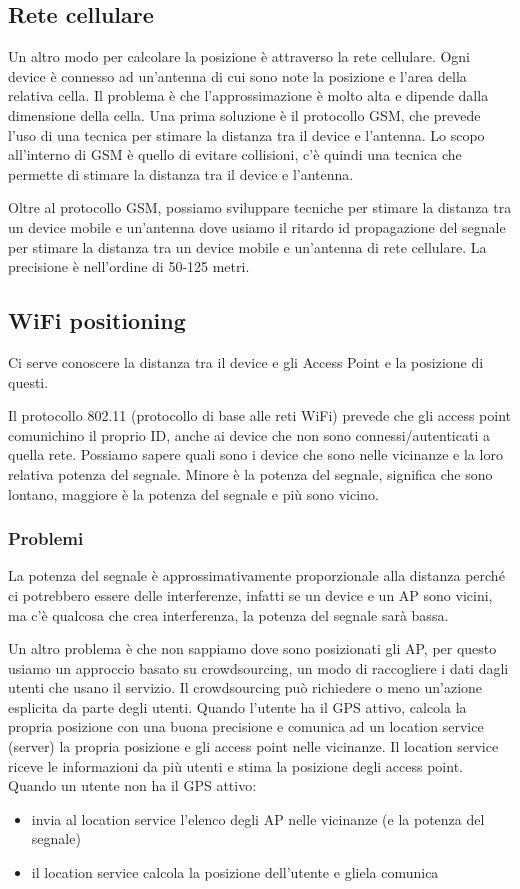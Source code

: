 \subsection{Rete cellulare}
Un altro modo per calcolare la posizione è attraverso la rete cellulare.
Ogni device è connesso ad un'antenna di cui sono note la posizione e l'area della relativa cella. 
Il problema è che l'approssimazione è molto alta e dipende dalla dimensione della cella. 
Una prima soluzione è il protocollo GSM, che prevede l'uso di una tecnica per stimare la distanza tra il device e l'antenna.
Lo scopo all'interno di GSM è quello di evitare collisioni, c'è quindi una tecnica che permette di stimare la distanza tra il device e l'antenna. 

Oltre al protocollo GSM, possiamo sviluppare tecniche per stimare la distanza tra un device mobile e un'antenna dove usiamo il ritardo id propagazione del segnale per stimare la distanza tra un device mobile e un'antenna di rete cellulare. La precisione è nell'ordine di 50-125 metri. 


\subsection{WiFi positioning}
Ci serve conoscere la distanza tra il device e gli Access Point e la posizione di questi. 

Il protocollo 802.11 (protocollo di base alle reti WiFi) prevede che gli access point comunichino il proprio ID, anche ai device che non sono connessi/autenticati a quella rete.
Possiamo sapere quali sono i device che sono nelle vicinanze e la loro relativa potenza del segnale. Minore è la potenza del segnale, significa che sono lontano, maggiore è la potenza del segnale e più sono vicino.

\subsubsection{Problemi}
La potenza del segnale è approssimativamente proporzionale alla distanza perché ci potrebbero essere delle interferenze, infatti se un device e un AP sono vicini, ma c'è qualcosa che crea interferenza, la potenza del segnale sarà bassa.

Un altro problema è che non sappiamo dove sono posizionati gli AP, per questo usiamo un approccio basato su crowdsourcing, un modo di raccogliere i dati dagli utenti che usano il servizio. 
Il crowdsourcing può richiedere o meno un’azione esplicita da parte degli utenti.
Quando l'utente ha il GPS attivo, calcola la propria posizione con una buona precisione e comunica ad un location service (server) la propria posizione e gli access point nelle vicinanze. 
Il location service riceve le informazioni da più utenti e stima la posizione degli access point. 
Quando un utente non ha il GPS attivo: 
\begin{itemize}
    \item invia al location service l'elenco degli AP nelle vicinanze (e la potenza del segnale) 
    \item il location service calcola la posizione dell'utente e gliela comunica
\end{itemize}

